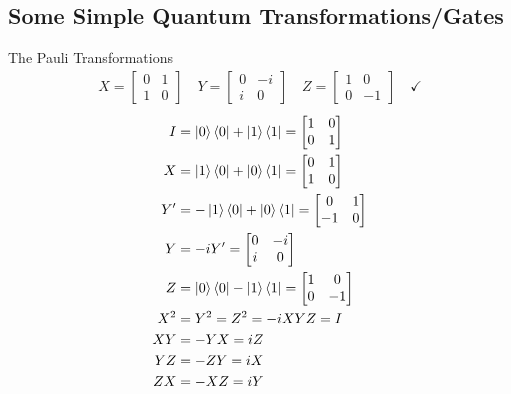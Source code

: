 \documentclass{beamer}
\begin{document}
\subsection{Some Simple Quantum Transformations/Gates}

\begin{frame}{The Pauli Transformations}
  {\tiny
    \begin{align*}
      X =
      \begin{bmatrix}
        0 & 1 \\
        1 & 0
      \end{bmatrix} \quad
      Y =
      \begin{bmatrix}
        0 & -i \\
        i & 0
      \end{bmatrix} \quad
      Z =
      \begin{bmatrix}
        1 & 0 \\
        0 & -1
      \end{bmatrix} \quad \checkmark
    \end{align*}
    \begin{align*}
      I &= \ket0\bra0 + \ket1\bra1 = \begin{bmatrix} 1 & 0 \\ 0 & 1 \end{bmatrix} \\
      X &= \ket1\bra0 + \ket0\bra1 = \begin{bmatrix} 0 & 1 \\ 1 & 0 \end{bmatrix} \\
      Y' &= -\ket1\bra0 + \ket0\bra1 = \begin{bmatrix} 0 & 1 \\ -1 & 0 \end{bmatrix} \\
      Y &= -iY' = \begin{bmatrix} 0 & -i \\ i & 0 \end{bmatrix} \\
      Z &= \ket0\bra0 - \ket1\bra1 = \begin{bmatrix} 1 & 0 \\ 0 & -1 \end{bmatrix} \\
      X^2 &= Y^2 = Z^2 = -iXYZ = I \\
      XY &= -YX = iZ \\
      YZ &= -ZY = iX \\
      ZX &= -XZ = iY
    \end{align*}
  }%
\end{frame}
\end{document}
